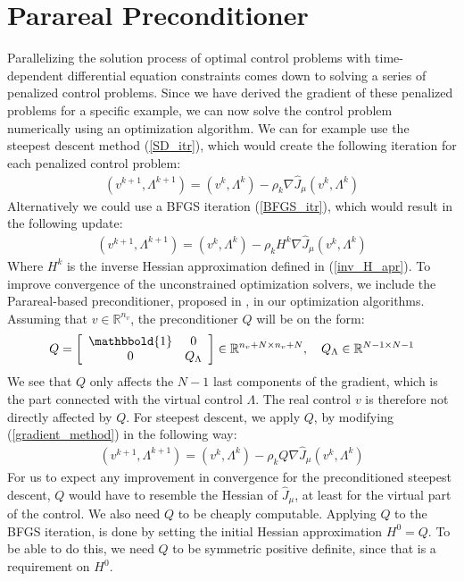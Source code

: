 \section{Parareal Preconditioner} \label{pc sec}
Parallelizing the solution process of optimal control problems with time-dependent differential equation constraints comes down to solving a series of penalized control problems. Since we have derived the gradient of these penalized problems for a specific example, we can now solve the control problem numerically using an optimization algorithm. We can for example use the steepest descent method (\ref{SD_itr}), which would create the following iteration for each penalized control problem:
\begin{align}
(v^{k+1},\Lambda^{k+1}) = (v^{k},\Lambda^{k}) -\rho_k\nabla\hat{J}_{\mu}(v^{k},\Lambda^{k}) \label{gradient_method}
\end{align}
Alternatively we could use a BFGS iteration (\ref{BFGS_itr}), which would result in the following update:
\begin{align}
(v^{k+1},\Lambda^{k+1}) = (v^{k},\Lambda^{k}) -\rho_kH^{k}\nabla\hat{J}_{\mu}(v^{k},\Lambda^{k}) \label{bfgs_method}
\end{align}
Where $H^k$ is the inverse Hessian approximation defined in (\ref{inv_H_apr}). To improve convergence of the unconstrained optimization solvers, we include the Parareal-based preconditioner, proposed in \cite{maday2002parareal}, in our optimization algorithms. Assuming that $v\in\mathbb{R}^{n_v}$, the preconditioner $Q$ will be on the form:
\begin{align}
Q = \left[ \begin{array}{cc}
	\mathbbold{1} & 0 \\
	0 & Q_{\Lambda} \\
	\end{array} \right]\in \mathbb{R}^{n_v+N\times n_v+N},\quad Q_{\Lambda}\in\mathbb{R}^{N-1\times N-1} \label{PC_form}
\end{align} 
We see that $Q$ only affects the $N-1$ last components of the gradient, which is the part connected with the virtual control $\Lambda$. The real control $v$ is therefore not directly affected by $Q$. For steepest descent, we apply $Q$, by modifying (\ref{gradient_method}) in the following way:
\begin{align}
(v^{k+1},\Lambda^{k+1}) = (v^{k},\Lambda^{k}) -\rho_kQ\nabla\hat{J}_{\mu}(v^{k},\Lambda^{k}) \label{gradient_method2}
\end{align}
For us to expect any improvement in convergence for the preconditioned steepest descent, $Q$ would have to resemble the Hessian of $\hat{J}_{\mu}$, at least for the virtual part of the control. We also need $Q$ to be cheaply computable. Applying $Q$ to the BFGS iteration, is done by setting the initial Hessian approximation $H^0=Q$. To be able to do this, we need $Q$ to be symmetric positive definite, since that is a requirement on $H^0$. 
